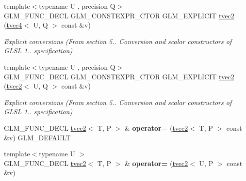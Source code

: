 \begin{DoxyCompactItemize}
\mbox{\label{structglm_1_1tvec2_a14d29e21c541c5efe511679d2d7c788a}} 
{\footnotesize template$<$typename U , precision Q$>$ }\\G\+L\+M\+\_\+\+F\+U\+N\+C\+\_\+\+D\+E\+CL G\+L\+M\+\_\+\+C\+O\+N\+S\+T\+E\+X\+P\+R\+\_\+\+C\+T\+OR G\+L\+M\+\_\+\+E\+X\+P\+L\+I\+C\+IT \hyperlink{structglm_1_1tvec2_a14d29e21c541c5efe511679d2d7c788a}{tvec2} (\hyperlink{structglm_1_1tvec4}{tvec4}$<$ U, Q $>$ const \&v)
\begin{DoxyCompactList}\small\item\em Explicit conversions (From section 5.. Conversion and scalar constructors of G\+L\+SL 1.. specification) \end{DoxyCompactList}\item 
\mbox{\label{structglm_1_1tvec2_a831bbad1e14099b7b8fe77b5efeb7c47}} 
{\footnotesize template$<$typename U , precision Q$>$ }\\G\+L\+M\+\_\+\+F\+U\+N\+C\+\_\+\+D\+E\+CL G\+L\+M\+\_\+\+C\+O\+N\+S\+T\+E\+X\+P\+R\+\_\+\+C\+T\+OR G\+L\+M\+\_\+\+E\+X\+P\+L\+I\+C\+IT \hyperlink{structglm_1_1tvec2_a831bbad1e14099b7b8fe77b5efeb7c47}{tvec2} (\hyperlink{structglm_1_1tvec2}{tvec2}$<$ U, Q $>$ const \&v)
\begin{DoxyCompactList}\small\item\em Explicit conversions (From section 5.. Conversion and scalar constructors of G\+L\+SL 1.. specification) \end{DoxyCompactList}\item 
\mbox{\label{structglm_1_1tvec2_af80d08c6419d329c7df4d622429e1d79}} 
G\+L\+M\+\_\+\+F\+U\+N\+C\+\_\+\+D\+E\+CL \hyperlink{structglm_1_1tvec2}{tvec2}$<$ T, P $>$ \& {\bfseries operator=} (\hyperlink{structglm_1_1tvec2}{tvec2}$<$ T, P $>$ const \&v) G\+L\+M\+\_\+\+D\+E\+F\+A\+U\+LT
\item 
\mbox{\label{structglm_1_1tvec2_a90eca373f8d7c27d73412f242cf1551e}} 
{\footnotesize template$<$typename U $>$ }\\G\+L\+M\+\_\+\+F\+U\+N\+C\+\_\+\+D\+E\+CL \hyperlink{structglm_1_1tvec2}{tvec2}$<$ T, P $>$ \& {\bfseries operator=} (\hyperlink{structglm_1_1tvec2}{tvec2}$<$ U, P $>$ const \&v)
\item 
\mbox{\label{structglm_1_1tvec2_ab4a77220c5c80ac512efab4303ed0a6d}} 

\end{DoxyCompactItemize}
